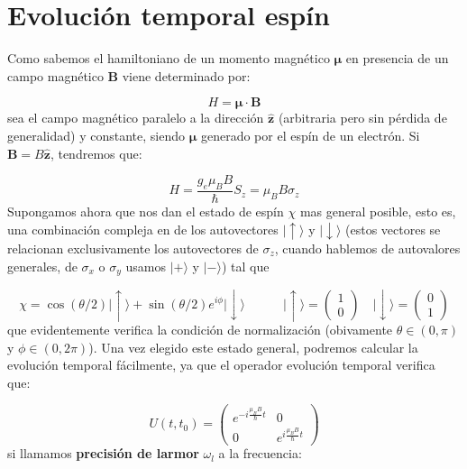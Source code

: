 \documentclass[12pt]{book}
\numberwithin{equation}{chapter}
\numberwithin{figure}{chapter}
\newcommand{\tquad}{\quad \quad \quad}
\newcommand{\eup}{\mid \uparrow \rangle}
\newcommand{\edw}{\mid \downarrow \rangle}
\newcommand{\zn}{\mathbf{z}}
\newcommand{\Bn}{\mathbf{B}}
\newcommand{\mun}{\boldsymbol{\mu}}
\newcommand{\hnz}{\hat{\zn}}
\begin{document}
\section{Evolución temporal espín} \label{Subsec:02.10}

Como sabemos el hamiltoniano de un momento magnético $\mun$ en presencia de un campo magnético $\Bn$ viene determinado por:

\begin{equation}
H = \mun \cdot \Bn
\end{equation}
sea el campo magnético paralelo a la dirección $\hnz$ (arbitraria pero sin pérdida de generalidad) y constante, siendo $\mun$ generado por el espín de un electrón. Si $\Bn = B \hnz$, tendremos que:

\begin{equation}
H = \frac{g_e \mu_B B}{\hbar} S_z = \mu_B B \sigma_z
\end{equation}
Supongamos ahora que nos dan el estado de espín $\chi$ mas general posible, esto es, una combinación compleja en de los autovectores $\eup$ y $\edw$ (estos vectores se relacionan exclusivamente los autovectores de $\sigma_z$, cuando hablemos de autovalores generales, de $\sigma_x$ o $\sigma_y$ usamos $|+\rangle$ y $|-\rangle$) tal que

\begin{equation}
\chi =  \cos (\theta/2) \eup + \sin (\theta/2) e^{i \phi} \edw \tquad \eup = 
\begin{pmatrix} 
1 \\ 
0 
\end{pmatrix} 
\quad \edw = \begin{pmatrix}
0  \\ 
1 
\end{pmatrix}
\end{equation}
que evidentemente verifica la condición de normalización (obivamente $\theta \in (0,\pi)$ y $\phi \in (0,2\pi)$). Una vez elegido este estado general, podremos calcular la evolución temporal fácilmente, ya que el operador evolución temporal verifica que:

\begin{equation}
U(t,t_0) = \begin{pmatrix}
e^{- i \frac{\mu_B B}{\hbar} t} & 0 \\
0  & e^{ i \frac{\mu_B B}{\hbar} t}
\end{pmatrix}
\end{equation}
si llamamos \textbf{precisión de larmor} $\omega_l$ a la frecuencia:
\end{document}
